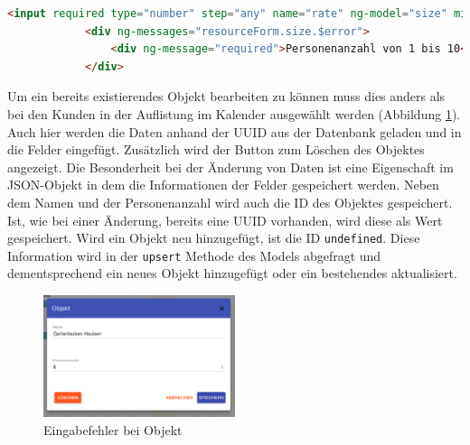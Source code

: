  \begin{lstlisting}[language=HTML, label=code_exampleRegistrationRequest, caption=Validierung der Personenanzahl im View]
		<input required type="number" step="any" name="rate" ng-model="size" min="1" max="10"  />
            <div ng-messages="resourceForm.size.$error">
                <div ng-message="required">Personenanzahl von 1 bis 10</div>
            </div>
\end{lstlisting}
 
Um ein bereits existierendes Objekt bearbeiten zu können muss dies anders als bei den Kunden in der Auflistung im Kalender ausgewählt werden (Abbildung \ref{frontend_resource_edit}). Auch hier werden die Daten anhand der UUID aus der Datenbank geladen und in die Felder eingefügt. Zusätzlich wird der Button zum Löschen des Objektes angezeigt. Die Besonderheit bei der Änderung von Daten ist eine Eigenschaft im JSON-Objekt in dem die Informationen der Felder gespeichert werden. Neben dem Namen und der Personenanzahl wird auch die ID des Objektes gespeichert. Ist, wie bei einer Änderung, bereits eine UUID vorhanden, wird diese als Wert gespeichert. Wird ein Objekt neu hinzugefügt, ist die ID \texttt{undefined}. Diese Information wird in der
\texttt{upsert} Methode des Models abgefragt und dementsprechend ein neues Objekt hinzugefügt oder ein bestehendes aktualisiert.

\begin{figure}[H]
\centering\includegraphics[width=0.5\textwidth]{images/frontend_resource_edit.png}
\caption{Eingabefehler bei Objekt}
\label{frontend_resource_edit}
\end{figure}
  
